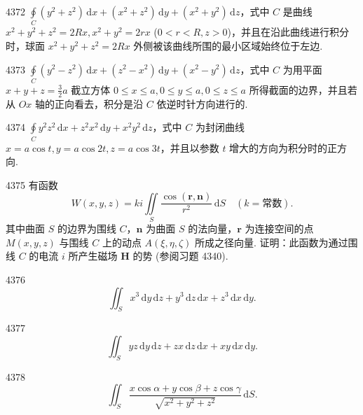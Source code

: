 \begin{prob}[M]{4372}
$\oint\limits_C (y^2 + z^2)\,\mathrm{d}x + (x^2 + z^2)\,\mathrm{d}y + (x^2 + y^2)\,\mathrm{d}z$，式中 $C$ 是曲线 $x^2 + y^2 + z^2 = 2Rx, x^2 + y^2 = 2rx$ ($0 < r < R, z > 0$)，并且在沿此曲线进行积分时，球面 $x^2 + y^2 + z^2 = 2Rx$ 外侧被该曲线所围的最小区域始终位于左边.
\end{prob}

\begin{prob}[M]{4373}
$\oint\limits_C (y^2 - z^2)\,\mathrm{d}x + (z^2 - x^2)\,\mathrm{d}y + (x^2 - y^2)\,\mathrm{d}z$，式中 $C$ 为用平面 $x + y + z = \frac{3}{2}a$ 截立方体 $0 \leqslant x \leqslant a, 0 \leqslant y \leqslant a, 0 \leqslant z \leqslant a$ 所得截面的边界，并且若从 $Ox$ 轴的正向看去，积分是沿 $C$ 依逆时针方向进行的.
\end{prob}

\begin{prob}[M]{4374}
$\oint\limits_C y^2z^2\,\mathrm{d}x + z^2x^2\,\mathrm{d}y + x^2y^2\,\mathrm{d}z$，式中 $C$ 为封闭曲线 $x = a\cos t, y = a\cos 2t, z = a\cos 3t$，并且以参数 $t$ 增大的方向为积分时的正方向.
\end{prob}

\begin{prob}[M]{4375}
有函数
\[
W(x, y, z) = ki \iint\limits_S \frac{\cos(\boldsymbol{r}, \boldsymbol{n})}{r^2}\,\mathrm{d}S \quad (k = \text{常数}).
\]
其中曲面 $S$ 的边界为围线 $C$，$\boldsymbol{n}$ 为曲面 $S$ 的法向量，$\boldsymbol{r}$ 为连接空间的点 $M(x, y, z)$ 与围线 $C$ 上的动点 $A(\xi, \eta, \zeta)$ 所成之径向量. 证明：此函数为通过围线 $C$ 的电流 $i$ 所产生磁场 $\boldsymbol{H}$ 的势 (参阅习题 4340).
\end{prob}



\begin{prob}[S]{4376}
\[\iint_{S} x^{3}\,\mathrm{d}y\,\mathrm{d}z + y^{3}\,\mathrm{d}z\,\mathrm{d}x + z^{3}\,\mathrm{d}x\,\mathrm{d}y.\]
\end{prob}

\begin{prob}[S]{4377}
\[\iint_{S} yz\,\mathrm{d}y\,\mathrm{d}z + zx\,\mathrm{d}z\,\mathrm{d}x + xy\,\mathrm{d}x\,\mathrm{d}y.\]
\end{prob}

\begin{prob}[S]{4378}
\[\iint_{S} \frac{x\cos\alpha + y\cos\beta + z\cos\gamma}{\sqrt{x^{2}+y^{2}+z^{2}}}\,\mathrm{d}S.\]
\end{prob}

